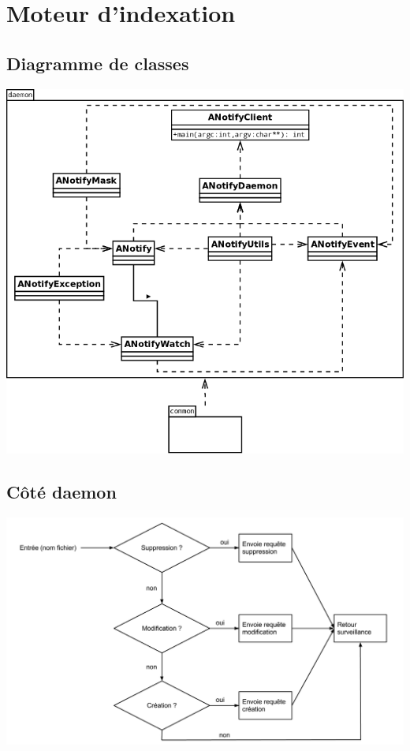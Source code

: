 \documentclass[a4paper,12pt]{report}
\begin{document}
\section{Moteur d'indexation}

\subsection{Diagramme de classes}\label{diagramme_classes_daemon}
\begin{center}
\includegraphics[scale=0.4]{"images/diagramme_classes_daemon"}
\end{center}

\newpage
\subsection{Côté daemon}\label{decision-daemon}
\begin{center}
\includegraphics[scale=0.37]{"images/decision_mi"}
\end{center}
\end{document}
